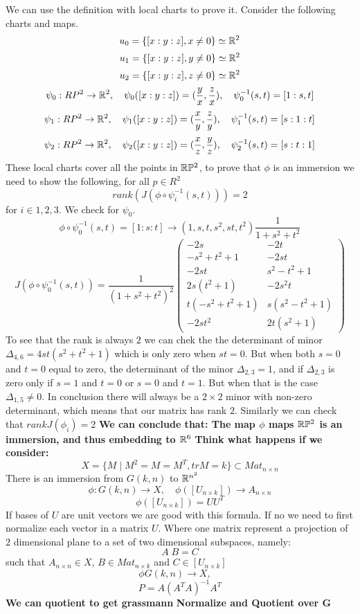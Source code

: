 \documentclass[11pt,a4paper]{report}
\begin{document}
We can use the definition with local charts to prove it. 
Consider the following charts and maps.
$$ u_0 =  \{ [x:y:z], x \neq 0 \} \simeq \mathbb{R}^2  $$
$$ u_1 =  \{ [x:y:z], y \neq 0 \} \simeq \mathbb{R}^2  $$
$$ u_2 = \{ [x:y:z], z \neq 0 \} \simeq \mathbb{R}^2  $$
$$ \psi_0: RP^2 \to \mathbb{R}^2, \quad
\psi_0([x:y:z]) = (\frac{y}{x}, \frac{z}{x}), \quad
\psi_0^{-1}(s,t) = [1:s,t]
$$
$$ \psi_1: RP^2 \to \mathbb{R}^2, \quad
\psi_1([x:y:z]) = (\frac{x}{y}, \frac{z}{y}), \quad
\psi_1^{-1}(s,t) = [s:1:t]
$$
$$ \psi_2: RP^2 \to \mathbb{R}^2, \quad
\psi_2([x:y:z]) = (\frac{x}{z}, \frac{y}{z}), \quad
\psi_2^{-1}(s,t) = [s:t:1]
$$
These local charts cover all the points in $\mathbb{R} \mathbb{P} ^2$, to prove that $\phi$ is an immersion
we need to show the following, for all $p \in R^2$
$$ rank(J(\phi \circ \psi_i^{-1}(s,t))) = 2 $$
for $i \in {1,2,3}$.
\newline
We check for $\psi_0$.
$$\phi \circ \psi_0^{-1}(s,t) = [1:s:t] \to (1,s,t,s^2,st,t^2) \frac{1}{1+s^2+t^2} $$
$$ J(\phi \circ \psi_0^{-1}(s,t)) = \frac{1}{(1+s^2+t^2)^2} 
\begin{pmatrix}
-2s & -2t \\
-s^2+t^2+1 & -2st \\
-2st & s^2-t^2+1 \\
2s (t^2+1) & -2 s^2 t \\
t (-s^2 + t^2 +1 ) & s (s^2 - t^2 + 1) \\
-2st^2 & 2t(s^2+1)
\end{pmatrix} 
$$
To see that the rank is always $2$ we can chek the the determinant of minor  $\Delta_{4,6} = 4 s t (s^2 + t^2 + 1)$ which is only zero when $st=0$.
But when both $s =0$ and  $t=0$ equal to zero, the determinant of the minor $\Delta_{2,3} = 1$, and if $\Delta_{2,3}$ is zero only if $s=1$ and $t=0$ or $s=0$ and $t=1$. 
But when that is the case $\Delta_{1,5} \neq 0 $. In conclusion there will always be a $2 \times 2$ minor with non-zero determinant, which means that our matrix has rank $2$.
Similarly we can check that $rank J(\phi_i) = 2$
\newline
\textbf{We can conclude that: The map $\phi$ maps $\mathbb{R} \mathbb{P} ^2$ is an immersion, and thus embedding to $\mathbb{R}^6$}
\newline
\textbf{Think what happens if we consider:}
$$ X = \{ M \; | \; M^2 = M = M^T, trM = k \} \subset Mat_{n \times n} $$
There is an immersion from $G(k,n)$ to $\mathbb{R}^{n^2}$
$$ \phi: G(k,n) \to X, \quad \phi([U_{n \times k}]) \to A_{n \times n}  $$
$$ \phi([U_{n \times k}]) = U U^T  $$
If bases of $U$ are unit vectors we are good with this formula. If no we need to first normalize each vector in a matrix $U$.
Where one matrix represent a projection of $2$ dimensional plane to a set of two dimensional subspaces, namely:
$$ A \; B  = C  $$
such that $A_{n \times n} \in X$, $ B \in Mat_{n \times k}$ and 
$ C \in [U_{n\times k}] $
$$ \phi G(k,n) \to X, \quad $$
$$ P = A (A^T A)^{-1} A^T $$
\textbf{We can quotient to get grassmann}
\textbf{Normalize and Quotient over G}
\newline
\cite{HuangWG16}
\cite{DBLP}

 
\end{document}
